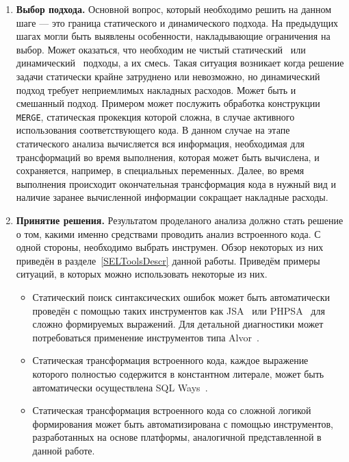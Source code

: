 \begin{enumerate}
  Отдельно нужно проверить наличие конструкций, которые заведомо усложняют автоматическую обработку системы. Примером такой конструкции может служить \verb|MERGE|\footnote{Операция позволяющая обновременно добовлять новые записи и обновлять существующие. Описание в документации по языку PL-SQL: \url{http://docs.oracle.com/cd/B10500_01/appdev.920/a96624/13_elems30.htm}. Посешён 29.07.2015.} в PL-SQL, проекция которого в другие языки может потребовать существенных усилий.
  
  \item \textbf{Выбор подхода.} Основной вопрос, который необходимо решить на данном шаге --- это граница статического и динамического подхода. На предыдущих шагах могли быть выявлены особенности, накладывающие ограничения на выбор. Может оказаться, что необходим не чистый статический~\cite{Syrcose} или динамический~\cite{DynamicDSQLTranslation} подходы, а их смесь. Такая ситуация возникает когда решение задачи статически крайне затруднено или невозможно, но динамический подход требует неприемлимых накладных расходов. Может быть и смешанный подход. Примером может послужить обработка конструкции \verb|MERGE|, статическая прокекция которой сложна, в случае активного использования соответствующего кода. В данном случае на этапе статического анализа вычисляется вся информация, необходимая для трансформаций во время выполнения, которая может быть вычислена, и сохраняется, например, в специальных переменных. Далее, во время выполнения происходит окончательная трансформация кода в нужный вид и наличие заранее вычисленной информации сокращает накладные расходы.
  
  \item \textbf{Принятие решения.} Результатом проделаного анализа должно стать решение о том, какими именно средствами проводить анализ встроенного кода. С одной стороны, необходимо выбрать инструмен. Обзор некоторых из них приведён в разделе~\ref{SELToolsDescr} данной работы. Приведём примеры ситуаций, в которых можно использовать некоторые из них.
  \begin{itemize}
    \item Статический поиск синтаксических ошибок может быть автоматически проведён с помощью таких инструментов как JSA~\cite{JSAUrl} или PHPSA~\cite{PHPSAUrl} для сложно формируемых выражений. Для детальной диагностики может потребоваться применение инструментов типа Alvor~\cite{AlvorUrl}.
    \item Статическая трансформация встроенного кода, каждое выражение которого полностью содержится в константном литерале, может быть автоматически осуществлена SQL Ways~\cite{SQLWays}.
    \item Статическая трансформация встроенного кода со сложной логикой формирования может быть автоматизирована с помощью инструментов, разработанных на основе платформы, аналогичной представленной в данной работе.
  \end{itemize}
  

\end{enumerate}
